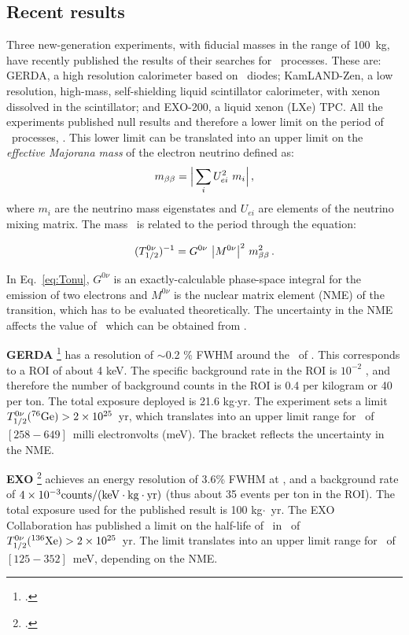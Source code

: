  \subsection*{Recent results}
 Three new-generation experiments, with fiducial masses in the range of 100~kg, have recently published the results of their searches for \bbonu\ processes. These are: GERDA, a high resolution calorimeter based on \GE\ diodes; KamLAND-Zen, a low resolution, high-mass, self-shielding liquid scintillator calorimeter, with xenon dissolved in the scintillator; and EXO-200, a liquid xenon (LXe) TPC. All the experiments published null results and therefore a lower limit on the period of \bbonu\ processes, \Tonu. This lower limit can be translated into an upper limit on the \emph{effective Majorana mass} of the electron neutrino defined as:
\begin{equation}
m_{\beta\beta} = \Big| \sum_{i} U^{2}_{ei} \ m_{i} \Big| \, ,
\end{equation}
%
where $m_{i}$ are the neutrino mass eigenstates and $U_{ei}$ are elements of the neutrino mixing matrix. The mass \mbb\ is related to the period through the equation:

\begin{equation}
(T^{0\nu}_{1/2})^{-1} = G^{0\nu} \ \big|M^{0\nu}\big|^{2} \ \mbb^{2} \, .
\label{eq:Tonu}
\end{equation}

In Eq.~\ref{eq:Tonu}, $G^{0\nu}$ is an exactly-calculable phase-space integral for the emission of two electrons and $M^{0\nu}$ is the nuclear matrix element (NME) of the transition, which has to be evaluated theoretically. The uncertainty in the NME affects the value of \mbb\ which can be obtained from \Tonu.
 
{\bf GERDA} \footcite{Agostini:2013mzu} has a resolution of $\sim$0.2 \% FWHM around the \Qbb\ of \GE. This corresponds to a ROI of about 4 keV. The specific background rate in the ROI is $10^{-2}$ \ckky, and therefore the number of background counts in the ROI is 0.4 per kilogram or 40 per ton. The total exposure deployed is 21.6 kg$\cdot$yr. The experiment sets a limit $T_{1/2}^{0\nu}({}^{76}\rm Ge)> 2 \times 10^{25}$~yr, which translates into an upper limit range for \mbb\ of $[258-649]$~milli electronvolts (meV). The bracket reflects the uncertainty in the NME.

{\bf EXO} \footcite{Albert:2014awa} achieves an energy resolution of 3.6\% FWHM at \Qbb, and a background rate of $ 4 \times 10^{-3}\rm counts/(keV \cdot kg \cdot yr)$ (thus about 35 events per ton in the ROI). The total exposure used for the published result is 100 kg$\cdot$~yr. The EXO Collaboration has published a limit on the half-life of \bbonu\ in \XE\ of $T_{1/2}^{0\nu}({}^{136}\rm Xe) > 2 \times 10^{25}$~yr. The limit translates into an upper limit range for \mbb\ of $[125-352]$~meV, depending on the NME.

